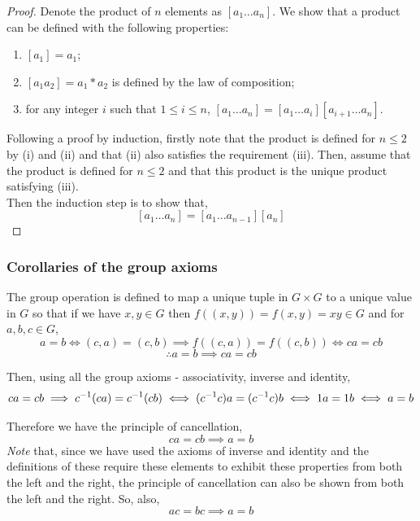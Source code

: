 \documentclass[MathsNotesBase.tex]{subfiles}
\begin{document}
{		
		\begin{proof}
			Denote the product of $n$ elements as ${ [a_1 \dots a_n] }$. We show that a product can be defined with the following properties:
			\begin{enumerate}[label=(\roman*)]
				\item{${ [a_1] = a_1 }$;}
				\item{${ [a_1a_2] = a_1 * a_2 }$ is defined by the law of composition;}
				\item{for any integer $i$ such that ${ 1 \leq i \leq n }$, ${ [a_1\dots a_n] = [a_1\dots a_i][a_{i+1}\dots a_n] }$.}
			\end{enumerate}
			Following a proof by induction, firstly note that the product is defined for ${ n \leq 2 }$ by (i) and (ii) and that (ii) also satisfies the requirement (iii). Then, assume that the product is defined for ${ n \leq 2 }$ and that this product is the unique product satisfying (iii).\\
			Then the induction step is to show that,
			\[ [a_1\dots a_n] = [a_1\dots a_{n-1}][a_n] \]
		\end{proof}
		
		\bigskip\bigskip
		\subsubsection{Corollaries of the group axioms}
		The group operation is defined to map a unique tuple in $G \times G$ to a unique value in $G$ so that if we have $x,y \in G$ then $f((x, y)) = f(x,y) = xy \in G$ and for $a,b,c \in G$,
		\[ a = b \iff (c, a) = (c, b) \implies f((c, a)) = f((c, b)) \iff ca = cb \]
		\[ \therefore a = b \implies ca = cb \]
		
		Then, using all the group axioms - associativity, inverse and identity,
		\[ ca = cb \implies {c}^{-1}(ca) = {c}^{-1}(cb) \iff ({c}^{-1}c)a = ({c}^{-1}c)b \iff 1a = 1b \iff a = b \]
		
		Therefore we have the principle of cancellation,
		\[ ca = cb \implies a = b \]
		\textit{Note} that, since we have used the axioms of inverse and identity and the definitions of these require these elements to exhibit these properties from both the left and the right, the principle of cancellation can also be shown from both the left and the right. So, also,
		\[ ac = bc \implies a = b \]
		
}
\end{document}
